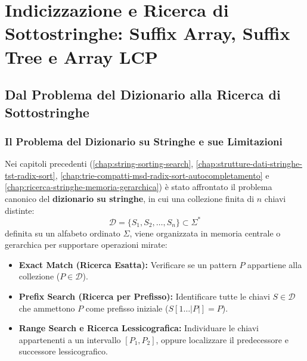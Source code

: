 \chapter{Indicizzazione e Ricerca di Sottostringhe: Suffix Array, Suffix Tree e Array LCP}
\label{ch:indicizzazione-ricerca-sottostringhe-suffix-array-tree}

\FloatBarrier
\section{Dal Problema del Dizionario alla Ricerca di Sottostringhe}
\label{sec:dizionario-vs-sottostringhe}

\FloatBarrier
\subsection{Il Problema del Dizionario su Stringhe e sue Limitazioni}
\label{subsec:dizionario-stringhe-review}

Nei capitoli precedenti (\autoref{chap:string-sorting-search}, \autoref{chap:strutture-dati-stringhe-tst-radix-sort}, \autoref{chap:trie-compatti-msd-radix-sort-autocompletamento} e \autoref{chap:ricerca-stringhe-memoria-gerarchica}) \`e stato affrontato il problema canonico del \textbf{dizionario su stringhe}, in cui una collezione finita di $n$ chiavi distinte:
\begin{equation}
  \mathcal{D} = \{S_1, S_2, \dots, S_n\} \subset \Sigma^*
\end{equation}
definita su un alfabeto ordinato $\Sigma$, viene organizzata in memoria centrale o gerarchica per supportare operazioni mirate:
\begin{itemize}
  \item \textbf{Exact Match (Ricerca Esatta):} Verificare se un pattern $P$ appartiene alla collezione ($P \in \mathcal{D}$).
  \item \textbf{Prefix Search (Ricerca per Prefisso):} Identificare tutte le chiavi $S \in \mathcal{D}$ che ammettono $P$ come prefisso iniziale ($S[1 \dots |P|] = P$).
  \item \textbf{Range Search e Ricerca Lessicografica:} Individuare le chiavi appartenenti a un intervallo $[P_1, P_2]$, oppure localizzare il predecessore e successore lessicografico.
\end{itemize}

